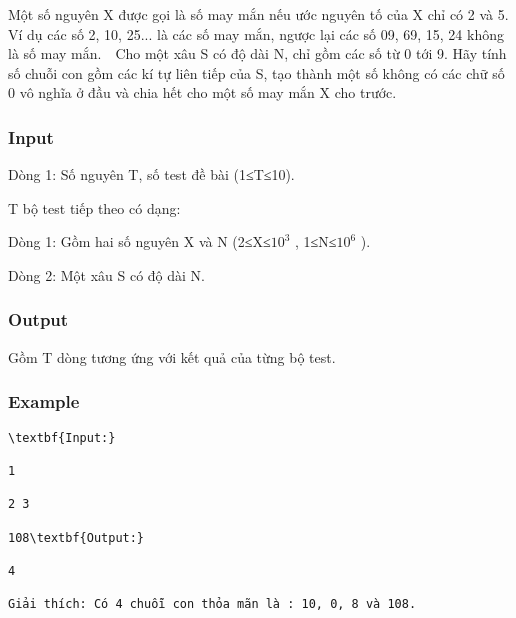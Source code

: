 



   Một số nguyên X được gọi là số may mắn nếu ước nguyên tố của X chỉ có 2 và 5. Ví dụ các số 2, 10, 25... là các số may mắn, ngược lại các số 09, 69, 15, 24 không là số may mắn.  Cho một xâu S có độ dài N, chỉ gồm các số từ 0 tới 9. Hãy tính số chuỗi con gồm các kí tự liên tiếp của S, tạo thành một số không có các chữ số 0 vô nghĩa ở đầu và chia hết cho một số may mắn X cho trước.  

\subsubsection{   Input  }

   Dòng 1: Số nguyên T, số test đề bài (1≤T≤10).  

   T bộ test tiếp theo có dạng:  

   Dòng 1: Gồm hai số nguyên X và N (2≤X≤$10^{3}$   , 1≤N≤$10^{6}$   ).  

   Dòng 2: Một xâu S có độ dài N.  

\subsubsection{   Output  }

   Gồm T dòng tương ứng với kết quả của từng bộ test.  

\subsubsection{   Example  }
\begin{verbatim}
\textbf{Input:}

1

2 3

108\textbf{Output:}

4

Giải thích: Có 4 chuỗi con thỏa mãn là : 10, 0, 8 và 108.\end{verbatim}
